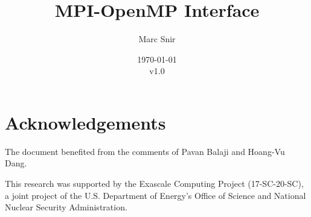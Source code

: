 \documentclass[11pt]{article}
\begin{document}
\title{\LARGE \bf MPI-OpenMP Interface}
 
\author{Marc Snir} 

\date{\today\\v1.0}
 
\maketitle





	





	


\section{Acknowledgements}
The document benefited from the comments of Pavan Balaji and Hoang-Vu Dang.

This research was supported by the Exascale Computing Project (17-SC-20-SC), a 
joint project of the U.S. Department of Energy’s Office of Science and National 
Nuclear Security Administration. 

 


\end{document}
